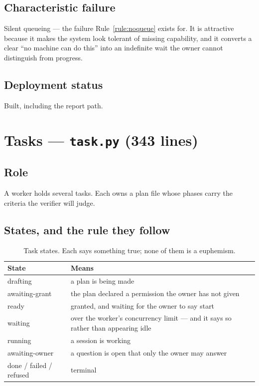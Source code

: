 \documentclass[11pt]{article}
\newcommand{\code}[1]{\texttt{\small #1}}
\begin{document}
\subsection{Characteristic failure}

Silent queueing --- the failure Rule~\ref{rule:noqueue} exists for. It is attractive because it makes the system look tolerant of missing capability, and it converts a clear ``no machine can do this'' into an indefinite wait the owner cannot distinguish from progress.

\subsection{Deployment status}

Built, including the report path.

\section{Tasks --- \code{task.py} (343 lines)}
\label{sec:task}

\subsection{Role}

A worker holds several tasks. Each owns a plan file whose phases carry the criteria the verifier will judge.

\subsection{States, and the rule they follow}

\begin{table}[h]
\centering\small
\caption{Task states. Each says something true; none of them is a euphemism.}
\label{tab:states}
\begin{tabular}{@{}L{3.2cm}L{10.2cm}@{}}
\toprule
\textbf{State} & \textbf{Means} \\
\midrule
drafting & a plan is being made \\
awaiting-grant & the plan declared a permission the owner has not given \\
ready & granted, and waiting for the owner to say start \\
waiting & over the worker's concurrency limit --- and it says so rather than appearing idle \\
running & a session is working \\
awaiting-owner & a question is open that only the owner may answer \\
done / failed / refused & terminal \\
\bottomrule
\end{tabular}
\end{table}
\end{document}
